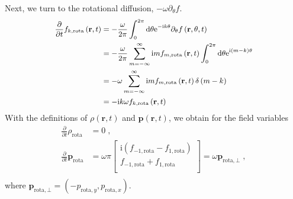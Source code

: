 \documentclass[a4paper, amsfonts, amssymb, amsmath, reprint, showkeys, showpacs, nofootinbib, twoside]{revtex4-2}
\begin{document}
Next, we turn to the rotational diffusion, $-\omega \partial _{\theta}f$. 
\begin{equation}
    \small
    \begin{aligned}
        \frac{\partial}{\partial t}f_{k,\mathrm{rota}}\left( \mathbf{r},t \right) &=-\frac{\omega}{2\pi}\int_0^{2\pi}{\mathrm{d}\theta \mathrm{e}^{-\mathrm{i}k\theta}\partial _{\theta}f\left( \mathbf{r},\theta ,t \right)}\\
        &=-\frac{\omega}{2\pi}\sum_{m=-\infty}^{\infty}{\mathrm{i}mf_{m,\mathrm{rota}}\left( \mathbf{r},t \right) \int_0^{2\pi}{\mathrm{d}\theta \mathrm{e}^{\mathrm{i}\left( m-k \right) \theta}}}\\
        &=-\omega \sum_{m=-\infty}^{\infty}{\mathrm{i}mf_{m,\mathrm{rota}}\left( \mathbf{r},t \right) \delta \left( m-k \right)}\\
        &=-\mathrm{i}k\omega f_{k,\mathrm{rota}}\left( \mathbf{r},t \right)\\
    \end{aligned}
\end{equation}
With the definitions of $\rho \left( \mathbf{r},t \right)$ and $\boldsymbol{p}\left( \mathbf{r},t \right)$, we obtain for the field variables
\begin{equation}
    \begin{aligned}
        \frac{\partial}{\partial t}\rho _{\mathrm{rota}}&=0\;,\\
        \frac{\partial}{\partial t}\boldsymbol{p}_{\mathrm{rota}}& =\omega \pi \left[ \begin{array}{c}
        \mathrm{i}\left( f_{-1,\mathrm{rota}}-f_{1,\mathrm{rota}} \right)\\
        f_{-1,\mathrm{rota}}+f_{1,\mathrm{rota}}\\
    \end{array} \right] =\omega \boldsymbol{p}_{\mathrm{rota},\bot}\;,\\
    \end{aligned}
\end{equation}
where $\boldsymbol{p}_{\mathrm{rota},\bot}=\left( -p_{\mathrm{rota},y},p_{\mathrm{rota},x} \right)$.
\end{document}
